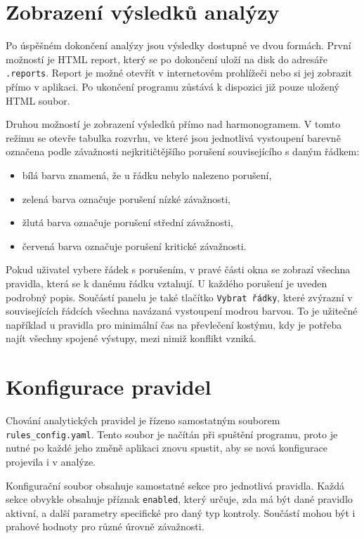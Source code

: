 \documentclass[czech, kiv, ba, he, iso690alph, pdf]{fasthesis}
\begin{document}
		\section{Zobrazení výsledků analýzy}
	
			Po úspěšném dokončení analýzy jsou výsledky dostupné ve dvou formách. První možností je HTML report, který se po dokončení uloží na disk do adresáře \texttt{.reports}. Report je možné otevřít v internetovém prohlížeči nebo si jej zobrazit přímo v aplikaci. Po ukončení programu zůstává k dispozici již pouze uložený HTML soubor.
	
			Druhou možností je zobrazení výsledků přímo nad harmonogramem. V tomto režimu se otevře tabulka rozvrhu, ve které jsou jednotlivá vystoupení barevně označena podle závažnosti nejkritičtějšího porušení souvisejícího s daným řádkem:
			\begin{itemize}
				\item bílá barva znamená, že u řádku nebylo nalezeno porušení,
				\item zelená barva označuje porušení nízké závažnosti,
				\item žlutá barva označuje porušení střední závažnosti,
				\item červená barva označuje porušení kritické závažnosti.
			\end{itemize}
	
			Pokud uživatel vybere řádek s porušením, v pravé části okna se zobrazí všechna pravidla, která se k danému řádku vztahují. U každého porušení je uveden podrobný popis. Součástí panelu je také tlačítko \texttt{Vybrat řádky}, které zvýrazní v souvisejících řádcích všechna navázaná vystoupení modrou barvou. To je užitečné například u pravidla pro minimální čas na převlečení kostýmu, kdy je potřeba najít všechny spojené výstupy, mezi nimiž konflikt vzniká.
	
		\section{Konfigurace pravidel}
	
			Chování analytických pravidel je řízeno samostatným souborem \texttt{rules\_config.yaml}. Tento soubor je načítán při spuštění programu, proto je nutné po každé jeho změně aplikaci znovu spustit, aby se nová konfigurace projevila i v analýze.
	
			Konfigurační soubor obsahuje samostatné sekce pro jednotlivá pravidla. Každá sekce obvykle obsahuje příznak \texttt{enabled}, který určuje, zda má být dané pravidlo aktivní, a další parametry specifické pro daný typ kontroly. Součástí mohou být i prahové hodnoty pro různé úrovně závažnosti.
	
\end{document}
